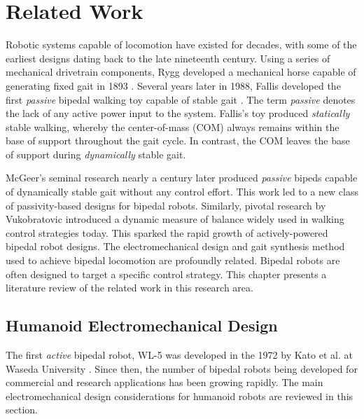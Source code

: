 \chapter{Related Work} %
\label{cha:background}
Robotic systems capable of locomotion have existed for decades, with some of the earliest designs dating back to the late nineteenth century. Using a series of mechanical drivetrain components, Rygg developed a mechanical horse capable of generating fixed gait in 1893 \cite{rygg1893mechanical}. Several years later in 1988, Fallis developed the first \emph{passive} bipedal walking toy capable of stable gait \cite{pallis1888fallis}. The term \emph{passive} denotes the lack of any active power input to the system. Fallis's toy produced \emph{statically} stable walking, whereby the center-of-mass (COM) always remains within the base of support throughout the gait cycle. In contrast, the COM leaves the base of support during \emph{dynamically} stable gait. 

McGeer's seminal research \cite{McGeer:1990uk} nearly a century later produced \emph{passive} bipeds capable of dynamically stable gait without any control effort. This work led to a new class of passivity-based designs for bipedal robots. Similarly, pivotal research by Vukobratovic \cite{vukobratovic1969} introduced a dynamic measure of balance widely used in walking control strategies today. This sparked the rapid growth of actively-powered bipedal robot designs. The electromechanical design and gait synthesis method used to achieve bipedal locomotion are profoundly related. Bipedal robots are often designed to target a specific control strategy. This chapter presents a literature review of the related work in this research area. 





\section{Humanoid Electromechanical Design} %
\label{sec:related_electromechanical_design}
The first \emph{active} bipedal robot, WL-5 was developed in the 1972 by Kato et al. at Waseda University \cite{kato1972hydraulically}. Since then, the number of bipedal robots being developed for commercial and research applications has been growing rapidly. The main electromechanical design considerations for humanoid robots are reviewed in this section. 


